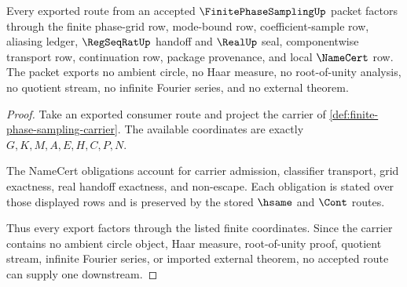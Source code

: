 \begin{theorem}
\label{thm:finite-phase-sampling-ledger-nonescape}
Every exported route from an accepted $\FinitePhaseSamplingUp$ packet factors through the finite phase-grid row, mode-bound row, coefficient-sample row, aliasing ledger, $\RegSeqRatUp$ handoff and $\RealUp$ seal, componentwise transport row, continuation row, package provenance, and local $\NameCert$ row. The packet exports no ambient circle, no Haar measure, no root-of-unity analysis, no quotient stream, no infinite Fourier series, and no external theorem.
\end{theorem}
\begin{proof}
Take an exported consumer route and project the carrier of \autoref{def:finite-phase-sampling-carrier}. The available coordinates are exactly $G,K,M,A,E,H,C,P,N$.

The NameCert obligations account for carrier admission, classifier transport, grid exactness, real handoff exactness, and non-escape. Each obligation is stated over those displayed rows and is preserved by the stored $\hsame$ and $\Cont$ routes.

Thus every export factors through the listed finite coordinates. Since the carrier contains no ambient circle object, Haar measure, root-of-unity proof, quotient stream, infinite Fourier series, or imported external theorem, no accepted route can supply one downstream.
\end{proof}


\begin{closurestatus}{\FinitePhaseSamplingUp}
  \theoryclosure{\seedClosure}
  \formalstatus{\unformalizedV}
\end{closurestatus}
